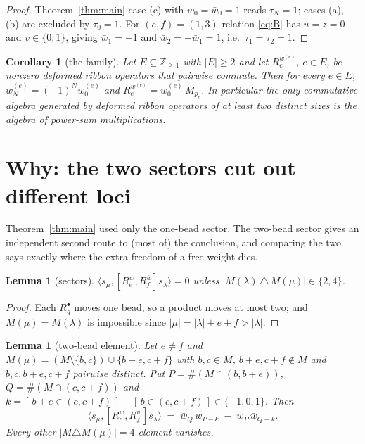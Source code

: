 \documentclass[11pt]{article}
\newtheorem{lemma}[theorem]{Lemma}
\newtheorem{corollary}[theorem]{Corollary}
\theoremstyle{definition}
\newcommand{\Z}{\mathbb{Z}}
\newcommand{\Mult}[1]{M_{#1}}
\begin{document}
\begin{proof}
Theorem~\ref{thm:main} case (c) with $w_0=\bar w_0=1$ reads $\tau_N=1$; cases (a), (b)
are excluded by $\tau_0=1$.  For $(e,f)=(1,3)$ relation \eqref{eq:B} has $u=z=0$ and
$v\in\{0,1\}$, giving $\bar w_1=-1$ and $\bar w_2=-\bar w_1=1$, i.e.\
$\tau_1=\tau_2=1$.
\end{proof}

\begin{corollary}[the family]\label{cor:family}
Let $E\subseteq\Z_{\ge1}$ with $|E|\ge2$ and let $R_e^{w^{(e)}}$, $e\in E$, be nonzero
deformed ribbon operators that pairwise commute.  Then for every $e\in E$,
$w^{(e)}_N=(-1)^Nw^{(e)}_0$ and $R_e^{w^{(e)}}=w^{(e)}_0\,\Mult{p_e}$.  In particular the
only commutative algebra generated by deformed ribbon operators of at least two distinct
sizes is the algebra of power-sum multiplications.
\end{corollary}

\section{Why: the two sectors cut out different loci}

Theorem~\ref{thm:main} used only the one-bead sector.  The two-bead sector gives an
independent second route to (most of) the conclusion, and comparing the two says exactly
where the extra freedom of a free weight dies.

\begin{lemma}[sectors]\label{lem:sectors}
$\langle s_\mu,[R_e^{w},R_f^{\bar w}]s_\lambda\rangle=0$ unless
$|M(\lambda)\,\triangle\,M(\mu)|\in\{2,4\}$.
\end{lemma}

\begin{proof}
Each $R^{\bullet}_g$ moves one bead, so a product moves at most two; and $M(\mu)=M(\lambda)$
is impossible since $|\mu|=|\lambda|+e+f>|\lambda|$.
\end{proof}

\begin{lemma}[two-bead element]\label{lem:twobead}
Let $e\ne f$ and $M(\mu)=(M\setminus\{b,c\})\cup\{b+e,c+f\}$ with $b,c\in M$,
$b+e,c+f\notin M$ and $b,c,b+e,c+f$ pairwise distinct.  Put $P=\#(M\cap(b,b+e))$,
$Q=\#(M\cap(c,c+f))$ and $k=[\,b+e\in(c,c+f)\,]-[\,b\in(c,c+f)\,]\in\{-1,0,1\}$.  Then
\[
  \bigl\langle s_\mu,[R_e^{w},R_f^{\bar w}]s_\lambda\bigr\rangle
  \;=\;\bar w_{Q}\,w_{P-k}\;-\;w_{P}\,\bar w_{Q+k}.
\]
Every other $|M\triangle M(\mu)|=4$ element vanishes.
\end{lemma}
\end{document}
